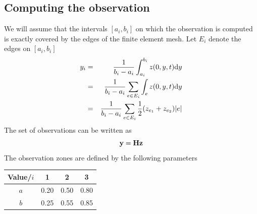 \documentclass[12pt]{article}
\begin{document}
\subsection{Computing the observation}
We will assume that the intervals $[a_i, b_i]$ on which the observation is computed is exactly covered by the edges of the finite element mesh. Let $E_i$ denote the edges on $[a_i,b_i]$
\begin{eqnarray*}
y_i &=& \frac{1}{b_i-a_i} \int_{a_i}^{b_i} z(0,y,t) \textrm{d} y \\
&=& \frac{1}{b_i-a_i} \sum_{e \in E_i} \int_e z(0,y,t) \textrm{d} y \\
&=& \frac{1}{b_i-a_i} \sum_{e \in E_i} \frac{1}{2} (z_{e_1} + z_{e_2}) |e|
\end{eqnarray*}
The set of observations can be written as
\[
{\mathbf y} = {\mathbf H} {\mathbf z}
\]
The observation zones are defined by the following parameters
\begin{center}
\begin{tabular}{|c|c|c|c|}
\hline
Value/$i$ & 1 & 2 & 3 \\
\hline
$a$ & 0.20 & 0.50 & 0.80 \\
\hline
$b$ & 0.25 & 0.55 & 0.85 \\
\hline
\end{tabular}
\end{center}
\end{document}
